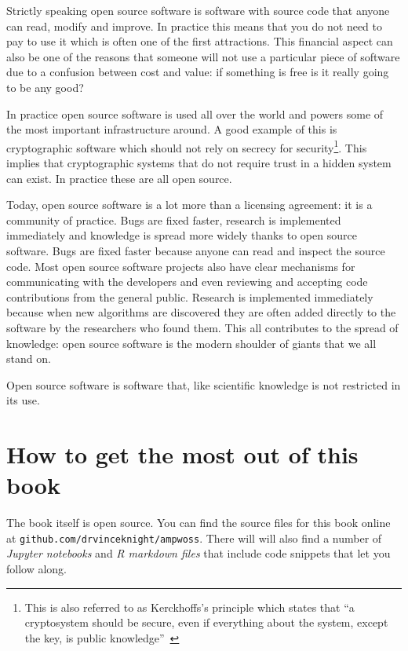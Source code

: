 Strictly speaking open source software is software with source code that
anyone can read, modify and improve. In practice this means that you do
not need to pay to use it which is often one of the first attractions.
This financial aspect can also be one of the reasons that someone will
not use a particular piece of software due to a confusion between cost
and value: if something is free is it really going to be any good?

In practice open source software is used all over the world and powers
some of the most important infrastructure around.
A good example of this is cryptographic software which should not rely on
secrecy for security\footnote{This
is also referred to as Kerckhoffs's principle which states that ``a cryptosystem
should be secure, even if everything about the system, except the key, is public
knowledge''~\cite{kerckhoffs1883cryptographie}}. This implies that
cryptographic systems that do not require trust in a hidden system can exist.
In practice these are all open source.

Today, open source software is a lot more than a licensing agreement:
it is a community of practice. Bugs are fixed faster, research is
implemented immediately and knowledge is spread more widely thanks to
open source software. Bugs are fixed faster because anyone can read and
inspect the source code. Most open source software projects also have
clear mechanisms for communicating with the developers and even
reviewing and accepting code contributions from the general public.
Research is implemented immediately because when new algorithms are
discovered they are often added directly to the software by the
researchers who found them. This all contributes to the spread of
knowledge: open source software is the modern shoulder of giants that
we all stand on.

Open source software is software that, like scientific knowledge is not
restricted in its use.

\section{How to get the most out of this
book}\label{sec:how-to-get-the-most-out-of-this-book}

The book itself is open source. You can find the source files for this
book online at \texttt{github.com/drvinceknight/ampwoss}. There will will
also find a number of \emph{Jupyter notebooks} and \emph{R markdown
files} that include code snippets that let you follow along.

